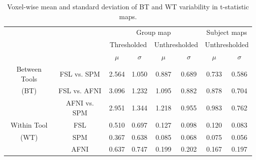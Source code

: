 \documentclass[11pt,onecolumn]{article}
\begin{document}
\setlength{\tabcolsep}{5pt}
\begin{table}[h]
  \centering
  \begin{tabular}{cccccc|cc}
    \toprule
                      &              & \multicolumn{4}{c|}{Group map}  & \multicolumn{2}{c}{Subject maps}                                                                     \\
    \multirow{2}{*}{} & {}           & \multicolumn{2}{c}{Thresholded} & \multicolumn{2}{c|}{Unthresholded} & \multicolumn{2}{c}{Unthresholded}                               \\
    {}                & {}           & $\mu$                           & $\sigma$                           & $\mu$                             & $\sigma$ & $\mu$ & $\sigma$ \\
    \midrule
    \rowcolor{lightgray!50}
    {Between Tools}   & FSL vs. SPM  & 2.564                           & 1.050                              & 0.887                             & 0.689    & 0.733 & 0.586    \\
    \rowcolor{lightgray!50}
    {(BT)}            & FSL vs. AFNI & 3.096                           & 1.232                              & 1.095                             & 0.882    & 0.878 & 0.704    \\
    \rowcolor{lightgray!50}
    {}                & AFNI vs. SPM & 2.951                           & 1.344                              & 1.218                             & 0.955    & 0.983 & 0.762    \\
    {Within Tool}     & FSL          & 0.510                           & 0.697                              & 0.127                             & 0.098    & 0.120 & 0.083    \\
    {(WT)}            & SPM          & 0.367                           & 0.638                              & 0.085                             & 0.068    & 0.075 & 0.056    \\
    {}                & AFNI         & 0.637                           & 0.747                              & 0.199                             & 0.202    & 0.167 & 0.197    \\
    \bottomrule
  \end{tabular}
  \caption{Voxel-wise mean and standard deviation of BT and WT variability
    in t-statistic maps.}
  \label{table:pipeline-stats}
\end{table}
\end{document}
